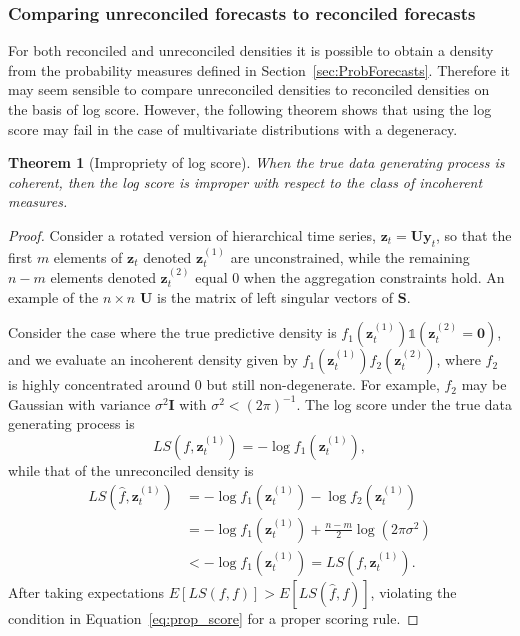 \documentclass[12pt]{article}
\newtheorem{theo}{Theorem}[section]
\theoremstyle{definition}
\begin{document}
\subsubsection{Comparing unreconciled forecasts to reconciled forecasts}

For both reconciled and unreconciled densities it is possible to obtain a density from the probability measures defined in Section~\ref{sec:ProbForecasts}. Therefore it may seem sensible to compare unreconciled densities to reconciled densities on the basis of log score. However, the following theorem shows that using the log score may fail in the case of multivariate distributions with a degeneracy.

\begin{theo}[Impropriety of log score]
	When the true data generating process is coherent, then the log score is improper with respect to the class of incoherent measures.
\end{theo}

\begin{proof}
	Consider a rotated version of hierarchical time series, $\bm{z}_t=\bm{U}\bm{y}_t$, so that the first $m$ elements of $\bm{z}_t$ denoted $\bm{z}^{(1)}_t$ are unconstrained, while the remaining $n-m$ elements denoted $\bm{z}^{(2)}_t$ equal $0$ when the aggregation constraints hold. An example of the $n\times n$ $\bm{U}$ is the matrix of left singular vectors of $\bm{S}$. 
	
	Consider the case where the true predictive density is $f_1(\bm{z}^{(1)}_t)\mathbb{1}\left(\bm{z}^{(2)}_t=\bm{0}\right)$, and we evaluate an incoherent density given by $f_1(\bm{z}^{(1)}_t)f_2(\bm{z}^{(2)}_t)$, where $f_2$ is highly concentrated around $0$ but still non-degenerate. For example, $f_2$ may be Gaussian with variance $\sigma^2{\bm{I}}$ with $\sigma^2 < (2\pi)^{-1}$. The log score under the true data generating process is
	\[
	LS\left(f,\bm{z}^{(1)}_t\right) = -\log f_1\left(\bm{z}^{(1)}_t\right),
	\]
	while that of the unreconciled density is
	\begin{align}
	LS\left(\hat{f},\bm{z}^{(1)}_t\right) &= -\log f_1(\bm{z}^{(1)}_t)- \log f_2(\bm{z}^{(1)}_t)\\
	&= -\log f_1(\bm{z}^{(1)}_t)+\frac{n-m}{2}\log(2\pi\sigma^2)\\
	&<-\log f_1(\bm{z}^{(1)}_t)=LS\left(f,\bm{z}^{(1)}_t\right).
	\end{align}
	After taking expectations $E\left[LS(f,f)\right] > E\left[LS(\hat{f},f)\right]$, violating the condition in Equation~\eqref{eq:prop_score} for a proper scoring rule.
\end{proof}
\end{document}
